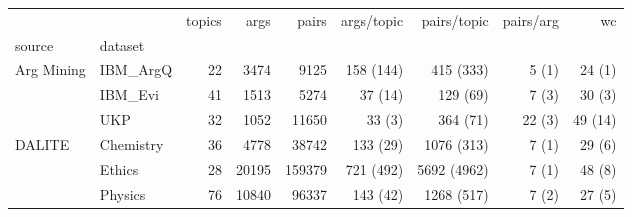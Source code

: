 \begin{tabular}{llrrrrrrr}
\toprule
       &         &  topics &   args &   pairs & args/topic &  pairs/topic & pairs/arg &       wc \\
source & dataset &         &        &         &            &              &           &          \\
\midrule
Arg Mining & IBM\_ArgQ &      22 &   3474 &    9125 &  158 (144) &    415 (333) &     5 (1) &   24 (1) \\
       & IBM\_Evi &      41 &   1513 &    5274 &    37 (14) &     129 (69) &     7 (3) &   30 (3) \\
       & UKP &      32 &   1052 &   11650 &     33 (3) &     364 (71) &    22 (3) &  49 (14) \\
DALITE & Chemistry &      36 &   4778 &   38742 &   133 (29) &   1076 (313) &     7 (1) &   29 (6) \\
       & Ethics &      28 &  20195 &  159379 &  721 (492) &  5692 (4962) &     7 (1) &   48 (8) \\
       & Physics &      76 &  10840 &   96337 &   143 (42) &   1268 (517) &     7 (2) &   27 (5) \\
\bottomrule
\end{tabular}
